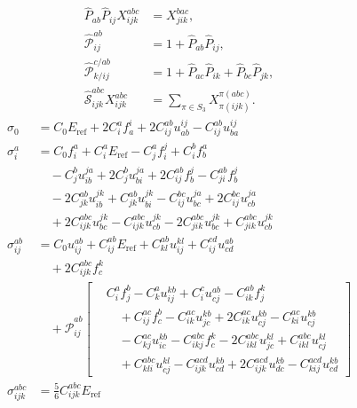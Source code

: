 \begin{align}
\widehat P_{ab}\widehat P_{ij}X^{abc}_{ijk} &= X^{bac}_{jik}, \\
\widehat{\mathcal P}^{ab}_{ij} &= 1+\widehat P_{ab}\widehat P_{ij}, \\
\widehat{\mathcal P}^{c/ab}_{k/ij} &= 1+\widehat P_{ac}\widehat P_{ik}+\widehat P_{bc}\widehat P_{jk}, \\
\widehat{\mathcal S}^{abc}_{ijk}X^{abc}_{ijk} &= \sum_{\pi\in S_3}X^{\pi(abc)}_{\pi(ijk)}.
\end{align}
\begin{align}
\sigma_{0} &= C_{0} E_{\mathrm{ref}} + 2 C^{a}_{i} f^{i}_{a} + 2 C^{ab}_{ij} u^{ij}_{ab} - C^{ab}_{ij} u^{ij}_{ba} \\
\sigma^{a}_{i} &= C_{0} f^{a}_{i} + C^{a}_{i} E_{\mathrm{ref}} - C^{a}_{j} f^{j}_{i} + C^{b}_{i} f^{a}_{b} \\
&\quad -C^{b}_{j} u^{ja}_{ib} + 2 C^{b}_{j} u^{ja}_{bi} + 2 C^{ab}_{ij} f^{j}_{b} - C^{ab}_{ji} f^{j}_{b} \\
&\quad -2 C^{ab}_{jk} u^{jk}_{ib} + C^{ab}_{jk} u^{jk}_{bi} - C^{bc}_{ij} u^{ja}_{bc} + 2 C^{bc}_{ij} u^{ja}_{cb} \\
&\quad {}+ 2 C^{abc}_{ijk} u^{jk}_{bc} - C^{abc}_{ijk} u^{jk}_{cb} - 2 C^{abc}_{jik} u^{jk}_{bc} + C^{abc}_{jik} u^{jk}_{cb} \\
\sigma^{ab}_{ij} &= C_{0} u^{ab}_{ij} + C^{ab}_{ij} E_{\mathrm{ref}} + C^{ab}_{kl} u^{kl}_{ij} + C^{cd}_{ij} u^{ab}_{cd} \\
&\quad {}+ 2 C^{abc}_{ijk} f^{k}_{c} \\
&\quad {}+ \widehat{\mathcal P}^{ab}_{ij}\left[\begin{aligned}& C^{a}_{i} f^{b}_{j} - C^{a}_{k} u^{kb}_{ij} + C^{c}_{i} u^{ab}_{cj} - C^{ab}_{ik} f^{k}_{j} \\ &\quad {}+ C^{ac}_{ij} f^{b}_{c} - C^{ac}_{ik} u^{kb}_{jc} + 2 C^{ac}_{ik} u^{kb}_{cj} - C^{ac}_{ki} u^{kb}_{cj} \\ &\quad -C^{ac}_{kj} u^{kb}_{ic} - C^{abc}_{ikj} f^{k}_{c} - 2 C^{abc}_{ikl} u^{kl}_{jc} + C^{abc}_{ikl} u^{kl}_{cj} \\ &\quad {}+ C^{abc}_{kli} u^{kl}_{cj} - C^{acd}_{ijk} u^{kb}_{cd} + 2 C^{acd}_{ijk} u^{kb}_{dc} - C^{acd}_{kij} u^{kb}_{cd}\end{aligned}\right] \\
\sigma^{abc}_{ijk} &= \frac{5}{6} C^{abc}_{ijk} E_{\mathrm{ref}} \\

\end{align}
